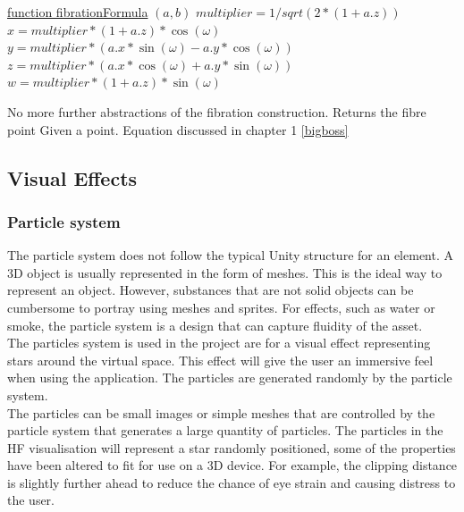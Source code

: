 \documentclass[12pt]{article} %
\begin{document}
\begin{flushleft}
\begin{algorithm}[H]

    \underline{function fibrationFormula} $(a,b)$\;
    $
multiplier = 1 / sqrt(2 * (1 + a.z))$\;
$x = multiplier * (1 + a.z) * \cos(\omega)$\;
$y = multiplier * (a.x * \sin(\omega) - a.y * \cos(\omega))$\;
$z = multiplier * (a.x * \cos(\omega) + a.y * \sin(\omega))$\;
$w = multiplier * (1 + a.z) * \sin(\omega)\;$
    \caption{No more further abstractions of the fibration construction. Returns the fibre point Given a point. Equation discussed in chapter 1 \eqref{bigboss}}
\end{algorithm}

\subsection{Visual Effects} %
\subsubsection{Particle system} %
The particle system does not follow the typical Unity structure for an element. A 3D object is usually represented in the form of meshes. This is the ideal way to represent an object. However, substances that are not solid objects can be cumbersome to portray using meshes and sprites. For effects, such as water or smoke, the particle system is a design that can capture fluidity of the asset.\\
The particles system is used in the project are for a visual effect representing stars around the virtual space. This effect will give the user an immersive feel when using the application. The particles are generated randomly by the particle system.\\
The particles can be small images or simple meshes that are controlled by the particle system that generates a large quantity of particles. The particles in the HF visualisation will represent a star randomly positioned, some of the properties have been altered to fit for use on a 3D device. For example, the clipping distance is slightly further ahead to reduce the chance of eye strain and causing distress to the user. \\

\end{flushleft}
\end{document}
